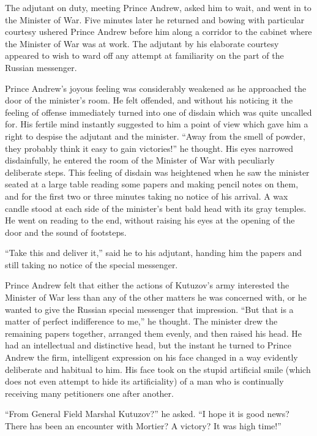 The adjutant on duty, meeting Prince Andrew, asked him to wait,
and went in to the Minister of War. Five minutes later he
returned and bowing with particular courtesy ushered Prince
Andrew before him along a corridor to the cabinet where the
Minister of War was at work. The adjutant by his elaborate
courtesy appeared to wish to ward off any attempt at familiarity
on the part of the Russian messenger.

Prince Andrew's joyous feeling was considerably weakened as he
approached the door of the minister's room. He felt offended, and
without his noticing it the feeling of offense immediately turned
into one of disdain which was quite uncalled for. His fertile
mind instantly suggested to him a point of view which gave him a
right to despise the adjutant and the minister. ``Away from the
smell of powder, they probably think it easy to gain victories!''
he thought. His eyes narrowed disdainfully, he entered the room
of the Minister of War with peculiarly deliberate steps. This
feeling of disdain was heightened when he saw the minister seated
at a large table reading some papers and making pencil notes on
them, and for the first two or three minutes taking no notice of
his arrival. A wax candle stood at each side of the minister's
bent bald head with its gray temples. He went on reading to the
end, without raising his eyes at the opening of the door and the
sound of footsteps.

``Take this and deliver it,'' said he to his adjutant, handing
him the papers and still taking no notice of the special
messenger.

Prince Andrew felt that either the actions of Kutuzov's army
interested the Minister of War less than any of the other matters
he was concerned with, or he wanted to give the Russian special
messenger that impression. ``But that is a matter of perfect
indifference to me,'' he thought. The minister drew the remaining
papers together, arranged them evenly, and then raised his
head. He had an intellectual and distinctive head, but the
instant he turned to Prince Andrew the firm, intelligent
expression on his face changed in a way evidently deliberate and
habitual to him. His face took on the stupid artificial smile
(which does not even attempt to hide its artificiality) of a man
who is continually receiving many petitioners one after another.

``From General Field Marshal Kutuzov?'' he asked. ``I hope it is
good news?  There has been an encounter with Mortier? A victory?
It was high time!''

